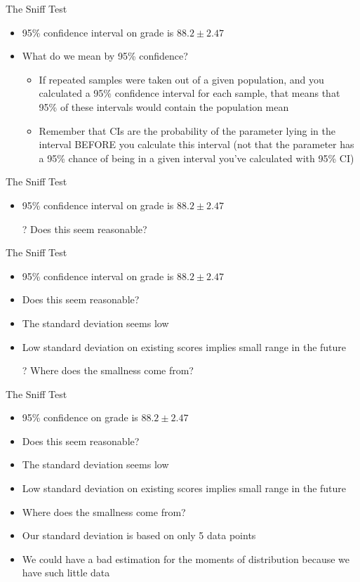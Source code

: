 \documentclass[aspectratio=169]{beamer}
\begin{document}
\begin{frame}{The Sniff Test}
\begin{itemize}
\item 95\% confidence interval on grade is $88.2 \pm 2.47$
\item What do we mean by 95\% confidence?
\begin{itemize}
\item If repeated samples were taken out of a given population, and you calculated a 95\% confidence interval for each sample, that means that 95\% of these intervals would contain the population mean
\item Remember that CIs are the probability of the parameter lying in the interval BEFORE you calculate this interval (not that the parameter has a 95\% chance of being in a given interval you've calculated with 95\% CI)
\end{itemize}
\end{itemize}
\end{frame}
\begin{frame}{The Sniff Test}
\begin{itemize}
\item 95\% confidence interval on grade is $88.2 \pm 2.47$
\item[?] Does this seem reasonable?
\end{itemize}
\end{frame}
\begin{frame}{The Sniff Test}
\begin{itemize}
\item 95\% confidence interval on grade is $88.2 \pm 2.47$
\item Does this seem reasonable?
\item The standard deviation seems low
\item Low standard deviation on existing scores implies small range in the future
\item[?] Where does the smallness come from?
\end{itemize}
\end{frame}
\begin{frame}{The Sniff Test}
\begin{itemize}
\item 95\% confidence on grade is $88.2 \pm 2.47$
\item Does this seem reasonable?
\item The standard deviation seems low
\item Low standard deviation on existing scores implies small range in the future
\item Where does the smallness come from?
\item Our standard deviation is based on only 5 data points
\item We could have a bad estimation for the moments of distribution because we have such little data
\end{itemize}
\end{frame}
\end{document}
